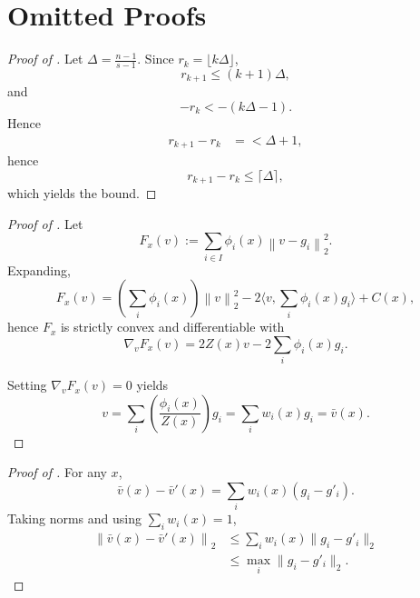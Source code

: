 \documentclass{article} %
\newcommand*{\norm}[1]{\left\|#1\right\|}
\theoremstyle{plain}
\theoremstyle{definition}
\theoremstyle{remark}
\begin{document}
\section{Omitted Proofs} \label{apx:proofs}


\begin{proof}[Proof of ]
Let $\Delta=\frac{n-1}{s-1}$. Since $r_k=\lfloor k\Delta\rfloor$,
\[ r_{k+1} \leq (k+1) \Delta, \]
and 
\[ - r_k < -( k \Delta - 1) . \]
Hence 
\begin{align*}
    r_{k+1} - r_k & = < \Delta + 1,
\end{align*}
hence \[r_{k+1} - r_k \le \lceil \Delta \rceil,\] which yields the bound.
\end{proof}


\begin{proof}[Proof of ]
Let 
    \[ F_x(v) := \sum_{i \in I} \phi_i(x) \norm{v-g_i}_2^2.\]
Expanding,
    \[ F_x(v) = \left( \sum_i \phi_i(x) \right) \norm{v}_2^2 - 2 \langle v,\sum_i \phi_i(x) g_i \rangle + C(x), \]
hence $F_x$ is strictly convex and differentiable with
    \[\nabla_v F_x(v) = 2 Z(x) v - 2 \sum_i \phi_i(x) g_i. \]

Setting $\nabla_v F_x(v) = 0$ yields 
    \[ v = \sum_i \left( \frac{\phi_i(x)}{Z(x)} \right)g_i=\sum_i w_i(x)g_i=\bar v(x). \]
\end{proof}



\begin{proof}[Proof of ]
For any $x$, 
    \[\bar v(x) - \bar v'(x) = \sum_i w_i(x) (g_i - g'_i). \]
Taking norms and using $\sum_i w_i(x) = 1$,
\begin{align*}
    \norm{\bar v(x) - \bar v'(x)}_2 & \le \sum_i w_i(x) \|g_i - g'_i\|_2 \\
    &\le \max_i \|g_i - g'_i\|_2.
\end{align*}
\end{proof}
\end{document}
